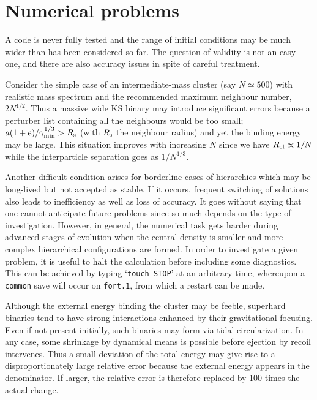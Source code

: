 \documentclass[12pt]{article}
\begin{document}
\section{Numerical problems}

A code is never fully tested and the range of initial conditions may be
much wider than has been considered so far.
The question of validity is not an easy one, and there are also accuracy
issues in spite of careful treatment.

Consider the simple case of an intermediate-mass cluster
(say $N \simeq 500$) with realistic mass spectrum and the recommended
maximum neighbour number, $2 N^{1/2}$.
Thus a massive wide KS binary may introduce significant errors because a
perturber list containing all the neighbours would be too small; \ie
$a (1 + e)/ \gamma_{\rm min}^{1/3} > R_{\rm s}$ (with $R_{\rm s}$ the
neighbour radius) and yet the binding energy may be large.
This situation improves with increasing $N$ since we have
$R_{\rm cl} \propto 1/N$ while the interparticle separation goes as
$1/N^{1/3}$.

Another difficult condition arises for borderline cases of hierarchies which
may be long-lived but not accepted as stable.
If it occurs, frequent switching of solutions also leads to inefficiency as
well as loss of accuracy.
It goes without saying that one cannot anticipate future problems since so
much depends on the type of investigation.
However, in general, the numerical task gets harder during advanced stages of
evolution when the central density is smaller and more complex hierarchical
configurations are formed.
In order to investigate a given problem, it is useful to halt the
calculation before including some diagnostics.
This can be achieved by typing `{\tt touch STOP}' at an arbitrary time,
whereupon a {\tt common} save will occur on {\tt fort.1}, from which a
restart can be made.

Although the external energy binding the cluster may be feeble, superhard
binaries tend to have strong interactions enhanced by their gravitational
focusing.
Even if not present initially, such binaries may form via tidal
circularization.
In any case, some shrinkage by dynamical means is possible before ejection
by recoil intervenes.
Thus a small deviation of the total energy may give rise to a
disproportionately large relative error because the external energy appears
in the denominator.
If larger, the relative error is therefore replaced by 100 times the actual
change.
\end{document}
